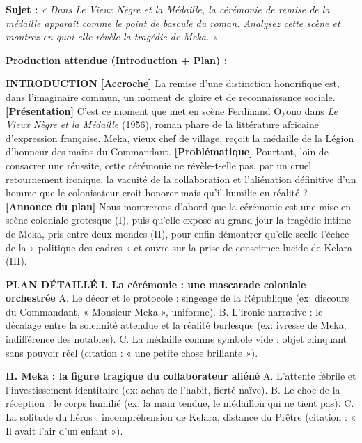 \documentclass[11pt]{article}
\begin{document}
\begin{exoresolu}
\textbf{Sujet :} \emph{« Dans \emph{Le Vieux Nègre et la Médaille}, la cérémonie de remise de la médaille apparaît comme le point de bascule du roman. Analysez cette scène et montrez en quoi elle révèle la tragédie de Meka. »}

\textbf{Production attendue (Introduction + Plan) :}

\textbf{INTRODUCTION}
\textbf{[Accroche]} La remise d'une distinction honorifique est, dans l'imaginaire commun, un moment de gloire et de reconnaissance sociale.
\textbf{[Présentation]} C'est ce moment que met en scène Ferdinand Oyono dans \emph{Le Vieux Nègre et la Médaille} (1956), roman phare de la littérature africaine d'expression française. Meka, vieux chef de village, reçoit la médaille de la Légion d'honneur des mains du Commandant.
\textbf{[Problématique]} Pourtant, loin de consacrer une réussite, cette cérémonie ne révèle-t-elle pas, par un cruel retournement ironique, la vacuité de la collaboration et l'aliénation définitive d'un homme que le colonisateur croit honorer mais qu'il humilie en réalité ?
\textbf{[Annonce du plan]} Nous montrerons d'abord que la cérémonie est une mise en scène coloniale grotesque (I), puis qu'elle expose au grand jour la tragédie intime de Meka, pris entre deux mondes (II), pour enfin démontrer qu'elle scelle l'échec de la « politique des cadres » et ouvre sur la prise de conscience lucide de Kelara (III).

\textbf{PLAN DÉTAILLÉ}
\textbf{I. La cérémonie : une mascarade coloniale orchestrée}
    A. Le décor et le protocole : singeage de la République (ex: discours du Commandant, « Monsieur Meka », uniforme).
    B. L'ironie narrative : le décalage entre la solennité attendue et la réalité burlesque (ex: ivresse de Meka, indifférence des notables).
    C. La médaille comme symbole vide : objet clinquant sans pouvoir réel (citation : « une petite chose brillante »).

\textbf{II. Meka : la figure tragique du collaborateur aliéné}
    A. L'attente fébrile et l'investissement identitaire (ex: achat de l'habit, fierté naïve).
    B. Le choc de la réception : le corps humilié (ex: la main tendue, le médaillon qui ne tient pas).
    C. La solitude du héros : incompréhension de Kelara, distance du Prêtre (citation : « Il avait l'air d'un enfant »).


\end{exoresolu}
\end{document}
